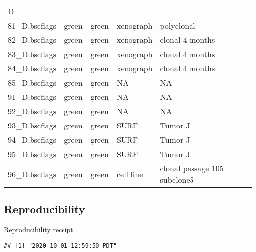 \documentclass[
]{article}
\begin{document}
\begin{longtable}[]{@{}lllll@{}}
D\tabularnewline
81\_D.bscflags & green & green & xenograph & polyclonal\tabularnewline
82\_D.bscflags & green & green & xenograph & clonal 4
months\tabularnewline
83\_D.bscflags & green & green & xenograph & clonal 4
months\tabularnewline
84\_D.bscflags & green & green & xenograph & clonal 4
months\tabularnewline
85\_D.bscflags & green & green & NA & NA\tabularnewline
91\_D.bscflags & green & green & NA & NA\tabularnewline
92\_D.bscflags & green & green & NA & NA\tabularnewline
93\_D.bscflags & green & green & SURF & Tumor J\tabularnewline
94\_D.bscflags & green & green & SURF & Tumor J\tabularnewline
95\_D.bscflags & green & green & SURF & Tumor J\tabularnewline
96\_D.bscflags & green & green & cell line & clonal passage 105
subclone5\tabularnewline
\bottomrule
\end{longtable}

\hypertarget{reproducibility}{%
\subsection{Reproducibility}\label{reproducibility}}

Reproducibility receipt

\begin{verbatim}
## [1] "2020-10-01 12:59:50 PDT"
\end{verbatim}
\end{document}
